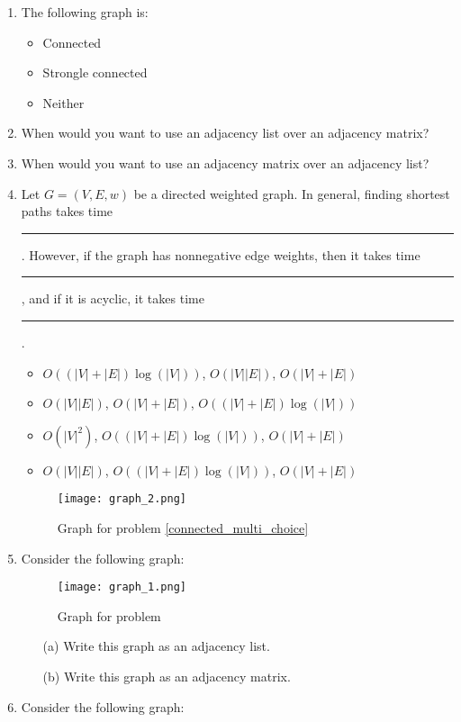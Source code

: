 \documentclass[12pt]{article}
\begin{document}
\newpage
\begin{enumerate}
    \item The following graph is:
    \begin{itemize}
        \item Connected
        \item Strongle connected
        \item Neither
    \end{itemize}
    \item When would you want to use an adjacency list over an adjacency matrix? 
    
    \item When would you want to use an adjacency matrix over an adjacency list?
    \item Let $G = (V,E,w)$ be a directed weighted graph. In general, finding shortest paths takes time \rule{1cm}{0.15mm}. However, if the graph has nonnegative edge weights, then it takes time \rule{1cm}{0.15mm}, and if it is acyclic, it takes time \rule{1cm}{0.15mm}. 
    \begin{itemize}
        \item $O((|V|+|E|)\log(|V|))$, $O(|V||E|)$, $O(|V|+|E|)$
        \item $O(|V||E|)$, $O(|V|+|E|)$, $O((|V|+|E|)\log(|V|))$
        \item $O(|V|^2)$, $O((|V|+|E|)\log(|V|))$, $O(|V|+|E|)$
        \item $O(|V||E|)$, $O((|V|+|E|)\log(|V|))$, $O(|V|+|E|)$
    \end{itemize} 
    \label{connected_multi_choice}
    \begin{figure}[h]
        \caption{Graph for problem \ref{connected_multi_choice}}
        \texttt{[image: graph\_2.png]}
    \end{figure}
    \newpage
    \item Consider the following graph:
    \begin{figure}[h]
        \caption{Graph for problem }
        \texttt{[image: graph\_1.png]}
    \end{figure}
    \begin{itemize}
        \item[(a)] Write this graph as an adjacency list.
        \item[(b)] Write this graph as an adjacency matrix.
    \end{itemize}
    \newpage
    \item Consider the following graph: 

\end{enumerate}
\end{document}
